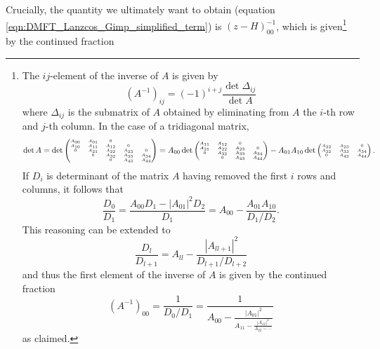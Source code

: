 \documentclass[10pt,a4paper,final]{article}
\begin{document}
Crucially, the quantity we ultimately want to obtain (equation \ref{eqn:DMFT_Lanzcos_Gimp_simplified_term}) is $(z-H)^{-1}_{00}$, which is given\footnote{
The $ij$-element of the inverse of $A$ is given by
%
\begin{equation}
(A^{-1})_{ij} = (-1)^{i+j}\frac{\det \Delta_{ij}}{\det A}
\end{equation}
%
where $\Delta_{ij}$ is the submatrix of $A$ obtained by eliminating from $A$ the $i$-th row and $j$-th column. In the case of a tridiagonal matrix,
%
\begin{equation}
\tiny
\det A = \det \begin{pmatrix}
A_{00} & A_{01} & 0      &        &        \\
A_{10} & A_{11} & A_{12} & 0      &        \\
0      & A_{21} & A_{22} & A_{23} & 0      \\
       & 0      & A_{32} & A_{33} & A_{34} \\
       &        & 0      & A_{43} & A_{44}
\end{pmatrix}
= A_{00}\det
\begin{pmatrix}
A_{11} & A_{12} & 0      &        \\
A_{21} & A_{22} & A_{23} & 0      \\
0      & A_{32} & A_{33} & A_{34} \\
       & 0      & A_{43} & A_{44}
\end{pmatrix}
-A_{01}A_{10}\det
\begin{pmatrix}
A_{22} & A_{23} & 0      \\
A_{32} & A_{33} & A_{34} \\
0      & A_{43} & A_{44}
\end{pmatrix}.
\footnotesize
\end{equation}
%
If $D_i$ is determinant of the matrix $A$ having removed the first $i$ rows and columns, it follows that
%
\begin{equation}
\frac{D_0}{D_1} = \frac{A_{00}D_1 - |A_{01}|^2D_2}{D_1} = A_{00} - \frac{A_{01}A_{10}}{D_1/D_2}.
\end{equation}
%
This reasoning can be extended to
%
\begin{equation}
\frac{D_l}{D_{l+1}} = A_{ll} - \frac{|A_{ll+1}|^2}{D_{l+1}/D_{l+2}}
\end{equation}
%
and thus the first element of the inverse of $A$ is given by the continued fraction
\begin{equation}
(A^{-1})_{00} = \frac{1}{D_0/D_1} = \frac{1}{A_{00}-\frac{|A_{01}|^2}{A_{11}-\frac{|A_{12}|^2}{A_{22} - \cdots}}}
\end{equation}
%
as claimed.
} by the continued fraction
\end{document}

